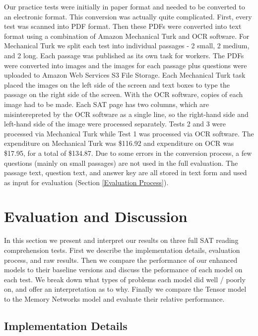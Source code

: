 \documentclass[pageno]{final_paper}
\begin{document}
Our practice tests were initially in paper format and needed to be converted to
an electronic format. This conversion was actually quite complicated. First,
every test was scanned into PDF format. Then these PDFs were converted into text
format using a combination of Amazon Mechanical Turk and OCR software. For
Mechanical Turk we split each test into individual passages - 2 small, 2 medium,
and 2 long. Each passage was published as its own task for workers. The PDFs
were converted into images and the images for each passage plus questions were
uploaded to Amazon Web Services S3 File Storage. Each Mechanical Turk task
placed the images on the left side of the screen and text boxes to type the
passage on the right side of the screen. With the OCR software, copies of each
image had to be made. Each SAT page has two columns, which are misinterepreted
by the OCR software as a single line, so the right-hand side and left-hand side
of the image were processed separately. Tests 2 and 3 were processed via
Mechanical Turk while Test 1 was processed via OCR software. The expenditure on
Mechanical Turk was \$116.92 and expenditure on OCR was \$17.95, for a total of
\$134.87. Due to some errors in the conversion process, a few questions (mainly
on small passages) are not used in the full evaluation. The passage text,
question text, and answer key are all stored in text form and used as input for
evaluation (Section \ref{Evaluation Process}).

\section{Evaluation and Discussion}
\label{Evaluation and Discussion}

In this section we present and interpret our results on three full SAT reading
comprehension tests. First we describe the implementation details, evaluation
process, and raw results. Then we compare the performance of our enhanced models
to their baseline versions and discuss the peformance of each model on each
test. We break down what types of problems each model did well / poorly on, and
offer an interpretation as to why. Finally we compare the Tensor model to the
Memory Networks model and evaluate their relative performance.

\subsection{Implementation Details}
\label{Implementation Details}
\end{document}
